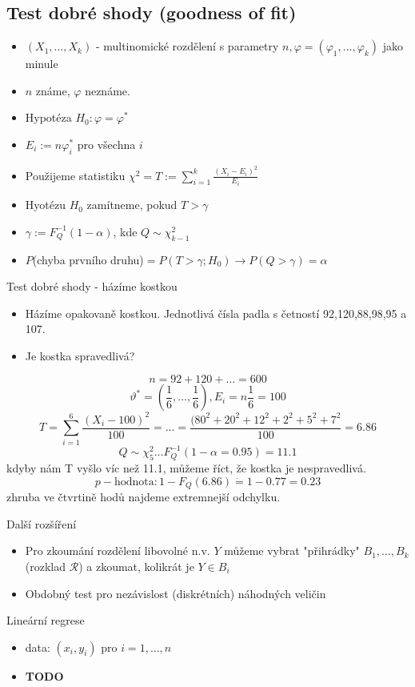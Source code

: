 \documentclass[../main.tex]{subfiles}
\begin{document}
\subsection{Test dobré shody (goodness of fit)}
\begin{itemize}
    \item $(X_1,\dots,X_k)$ - multinomické rozdělení s parametry $n,\varphi = (\varphi_1,\dots,\varphi_k)$ jako minule
    \item $n$ známe, $\varphi$ neznáme.
    \item Hypotéza $H_0: \varphi = \varphi^*$
    \item $E_i := n\varphi^*_i$ pro všechna $i$
    \item Použijeme statistiku $\chi^2 = T:= \sum^k_{i=1} \frac{(X_i-E_i)^2}{E_i}$
    \item Hyotézu $H_0$ zamítneme, pokud $T > \gamma$
    \item $\gamma := F^{-1}_Q (1-\alpha)$, kde $Q \sim \chi^2_{k-1}$
    \item $P$(chyba prvního druhu)$ = P(T > \gamma; H_0) \rightarrow P(Q>\gamma) = \alpha$
\end{itemize}
\begin{example}
    Test dobré shody - házíme kostkou\\
    \begin{itemize}
        \item Házíme opakovaně kostkou. Jednotlivá čísla padla s četností 92,120,88,98,95 a 107.
        \item Je kostka spravedlivá?
    \end{itemize}
    \[ n = 92 + 120 +\dots = 600\]
    \[\vartheta^* = (\frac{1}{6}, \dots, \frac{1}{6}), E_i = n \frac{1}{6} = 100\]
    \[T = \sum^6_{i=1} \frac{(X_i - 100)^2}{100} = \dots = \frac{(80^2 + 20^2 + 12^2 + 2^2 + 5^2 + 7^2}{100} = 6.86\]
    \[Q \sim \chi^2_5 \dots F^{-1}_Q (1 - \alpha = 0.95) = 11.1\]
    kdyby nám T vyšlo víc než 11.1, můžeme říct, že kostka je nespravedlivá.
    \[p-\text{hodnota}: 1-F_Q(6.86) \dot{=} 1 - 0.77 = 0.23\]
    zhruba ve čtvrtině hodů najdeme extremnejší odchylku.
\end{example}
Další rozšíření
\begin{itemize}
    \item Pro zkoumání rozdělení libovolné n.v. $Y$ můžeme vybrat "přihrádky" $B_1,\dots,B_k$ (rozklad $\mathcal{R}$) a zkoumat, kolikrát je $Y \in B_i$
    \item Obdobný test pro nezávislost (diskrétních) náhodných veličin 
\end{itemize}
\begin{definition}
    Lineární regrese
    \begin{itemize}
        \item data: $(x_i,y_i)$ pro $i=1,\dots,n$
        \item \textbf{TODO} 
    \end{itemize}
\end{definition}
\end{document}
